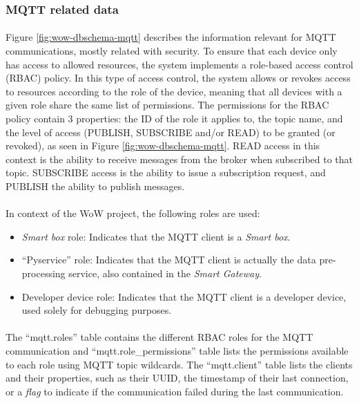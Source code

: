 \subsubsection{MQTT related data}

\paragraph{} Figure \ref{fig:wow-dbschema-mqtt} describes the information relevant for \acs{MQTT} communications, mostly related with security. To ensure that each device only has access to allowed resources, the system implements a role-based access control (\acs{RBAC}) policy. 
In this type of access control, the system allows or revokes access to resources according to the role of the device, meaning that all devices with a given role share the same list of permissions. The permissions for the \acs{RBAC} policy contain 3 properties: the ID of the role it applies to, the topic name, and the level of access (PUBLISH, SUBSCRIBE and/or READ) to be granted (or revoked), as seen in Figure \ref{fig:wow-dbschema-mqtt}. READ access in this context is the ability to receive messages from the broker when subscribed to that topic. SUBSCRIBE access is the ability to issue a subscription request, and PUBLISH the ability to publish messages.

\paragraph{} In context of the \acs{WoW} project, the following roles are used:

\begin{itemize}
    \item \textit{Smart box} role: Indicates that the \acs{MQTT} client is a \textit{Smart box}.
    \item ``Pyservice'' role: Indicates that the \acs{MQTT} client is actually the data pre-processing service, also contained in the \textit{Smart Gateway}.
    \item Developer device role: Indicates that the \acs{MQTT} client is a developer device, used solely for debugging purposes.
\end{itemize}

\paragraph{} The ``mqtt.roles'' table contains the different \acs{RBAC} roles for the \acs{MQTT} communication and ``mqtt.role\_permissions'' table lists the permissions available to each role using \acs{MQTT} topic wildcards. The ``mqtt.client'' table lists the clients and their properties, such as their \acs{UUID}, the timestamp of their last connection, or a \textit{flag} to indicate if the communication failed during the last communication.

